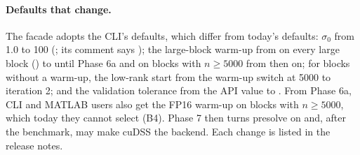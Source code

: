 \documentclass[11pt]{article}
\begin{document}
\paragraph{Defaults that change.}\label{sec:api-defaults} The facade adopts the CLI's defaults, which differ
from today's  defaults: $\sigma_0$ from 1.0 to 100 (; its comment says
); the large-block warm-up from  on every large block () to
 until Phase 6a and  on blocks with $n\ge5000$ from then on; for blocks without
a warm-up, the low-rank start from the warm-up switch at 5000 to iteration 2; and the validation tolerance
from the API value to . From Phase 6a, CLI and MATLAB users also get the FP16 warm-up on
blocks with $n\ge5000$, which today they cannot select (B4). Phase 7 then turns presolve on and, after the
benchmark, may make cuDSS the backend. Each change is listed in the release notes.

\end{document}
